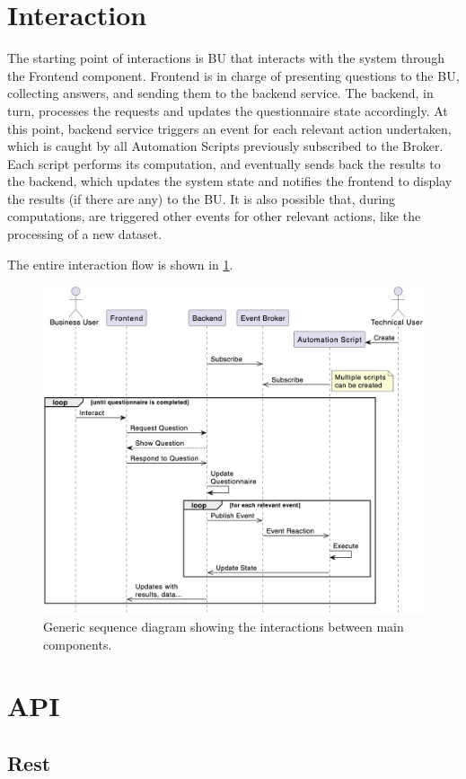 \documentclass[12pt,a4paper,openright,twoside]{book}
\begin{document}
\section{Interaction}
The starting point of interactions is \ac{BU} that interacts with the system through the Frontend component.
%
Frontend is in charge of presenting questions to the \ac{BU}, collecting answers, and sending them to the backend service.
%
The backend, in turn, processes the requests and updates the questionnaire state accordingly.
%
At this point, backend service triggers an event for each relevant action undertaken, which is caught by all Automation Scripts previously subscribed to the Broker.
%
Each script performs its computation, and eventually sends back the results to the backend, which updates the system state and notifies the frontend to display the results (if there are any) to the \ac{BU}.
%
It is also possible that, during computations, are triggered other events for other relevant actions, like the processing of a new dataset.

The entire interaction flow is shown in \cref{fig:sequence}.

\begin{figure}
    \centering
    \includegraphics[width=0.70\linewidth]{figures/diagrams/sequence.png}
    \caption{
        Generic sequence diagram showing the interactions between main components.
    }
    \label{fig:sequence}
\end{figure}



\section{\acs{API}}

\subsection{Rest}
\end{document}
